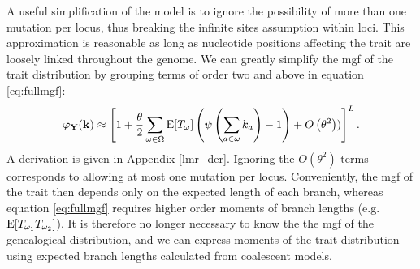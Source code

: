 A useful simplification of the model is to ignore the possibility of more than
one mutation per locus, thus breaking the infinite sites assumption within loci.
This approximation is reasonable as long as nucleotide positions affecting the
trait are loosely linked throughout the genome. We can greatly simplify the mgf
of the trait distribution by grouping terms of order two and above in equation
\eqref{eq:fullmgf}:
\begin{equation}
\label{eq:lowmut}
\varphi_{\mathbf{Y}}(\mathbf{k}) \approx \left[ 1 + \frac{\theta}{2} \sum_{\omega \in \Omega}
  \mathrm{E}[T_\omega] \left( \psi\left( \sum_{a \in \omega} k_a\right) -1 \right) +
  O\left( \theta^2 \right))\right]^L.
\end{equation}
A derivation is given in Appendix \ref{lmr_der}. Ignoring the
$O\left( \theta^2 \right)$ terms corresponds to allowing at most one mutation
per locus. Conveniently, the mgf of the trait then depends only on the expected
length of each branch, whereas equation \eqref{eq:fullmgf} requires higher order
moments of branch lengths (e.g. $\mathrm{E}[T_{\omega_1}T_{\omega_2}]$). It is therefore
no longer necessary to know the the mgf of the genealogical distribution, and we
can express moments of the trait distribution using expected branch lengths
calculated from coalescent models.

